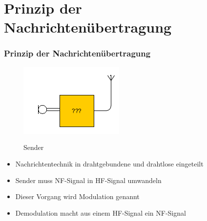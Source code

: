 

\subtitle{Technik Klasse E 14: \\
          Modulation \& Demodulation \\[2em]}
\date{Stand 15.12.2016}



\section*{Prinzip der Nachrichtenübertragung}
\begin{frame}
\frametitle{Prinzip der Nachrichtenübertragung}
\begin{center}
    \begin{figure}
      \includegraphics[width=\textwidth,height=.45\textheight,keepaspectratio]{e14/Sender.png}\\
      \caption{Sender}
    \end{figure}
\end{center}
\begin{itemize}
	\item Nachrichtentechnik in drahtgebundene und drahtlose eingeteilt
	\item Sender muss NF-Signal in HF-Signal umwandeln
	\item Dieser Vorgang wird Modulation genannt
	\item Demodulation macht aus einem HF-Signal ein NF-Signal
\end{itemize}
\end{frame}

